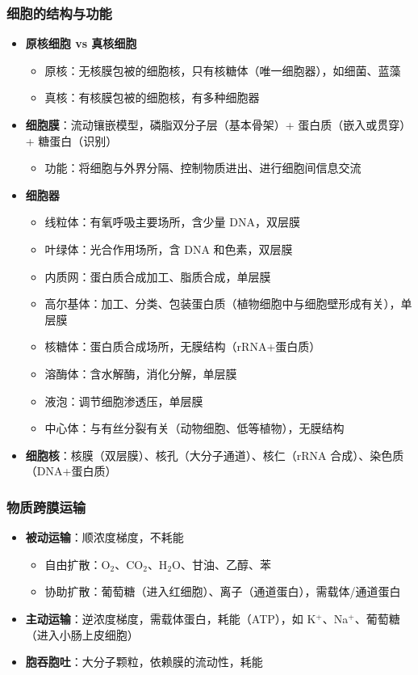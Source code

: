 \subsubsection{细胞的结构与功能}

\begin{itemize}
  \item \textbf{原核细胞 vs 真核细胞}
  \begin{itemize}
    \item 原核：无核膜包被的细胞核，只有核糖体（唯一细胞器），如细菌、蓝藻
    \item 真核：有核膜包被的细胞核，有多种细胞器
  \end{itemize}
  \item \textbf{细胞膜}：流动镶嵌模型，磷脂双分子层（基本骨架）+ 蛋白质（嵌入或贯穿）+ 糖蛋白（识别）
  \begin{itemize}
    \item 功能：将细胞与外界分隔、控制物质进出、进行细胞间信息交流
  \end{itemize}
  \item \textbf{细胞器}
  \begin{itemize}
    \item 线粒体：有氧呼吸主要场所，含少量 DNA，双层膜
    \item 叶绿体：光合作用场所，含 DNA 和色素，双层膜
    \item 内质网：蛋白质合成加工、脂质合成，单层膜
    \item 高尔基体：加工、分类、包装蛋白质（植物细胞中与细胞壁形成有关），单层膜
    \item 核糖体：蛋白质合成场所，无膜结构（rRNA+蛋白质）
    \item 溶酶体：含水解酶，消化分解，单层膜
    \item 液泡：调节细胞渗透压，单层膜
    \item 中心体：与有丝分裂有关（动物细胞、低等植物），无膜结构
  \end{itemize}
  \item \textbf{细胞核}：核膜（双层膜）、核孔（大分子通道）、核仁（rRNA 合成）、染色质（DNA+蛋白质）
\end{itemize}

\subsubsection{物质跨膜运输}

\begin{itemize}
  \item \textbf{被动运输}：顺浓度梯度，不耗能
  \begin{itemize}
    \item 自由扩散：O$_2$、CO$_2$、H$_2$O、甘油、乙醇、苯
    \item 协助扩散：葡萄糖（进入红细胞）、离子（通道蛋白），需载体/通道蛋白
  \end{itemize}
  \item \textbf{主动运输}：逆浓度梯度，需载体蛋白，耗能（ATP），如 K$^+$、Na$^+$、葡萄糖（进入小肠上皮细胞）
  \item \textbf{胞吞胞吐}：大分子颗粒，依赖膜的流动性，耗能
\end{itemize}

